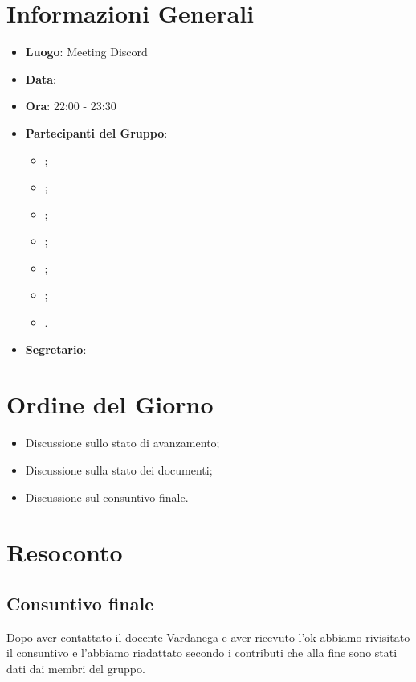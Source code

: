 \section{Informazioni Generali}

\begin{itemize}
	\item{\textbf{Luogo}}: Meeting Discord
	\item{\textbf{Data}}: \D
	\item{\textbf{Ora}}: 22:00 - 23:30
	\item{\textbf{Partecipanti del Gruppo}}:
	\begin{itemize}
		\item{\EP{};}
		\item{\FP{};}
		\item{\GC{};}
		\item{\LW{};}
  		\item {\MB{};}
		\item{\MG{};}
		\item{\PV{}.}
	\end{itemize}
	\item{\textbf{Segretario}}: \PV{}
\end{itemize}

\section{Ordine del Giorno}
\begin{itemize}
	\item{Discussione sullo stato di avanzamento;}
	\item{Discussione sulla stato dei documenti;}
 	\item{Discussione sul consuntivo finale.}
\end{itemize}

\section{Resoconto}
 
\subsection{Consuntivo finale}
Dopo aver contattato il docente Vardanega e aver ricevuto l'ok abbiamo rivisitato il consuntivo e l'abbiamo riadattato secondo i contributi che alla fine sono stati dati dai membri del gruppo.
